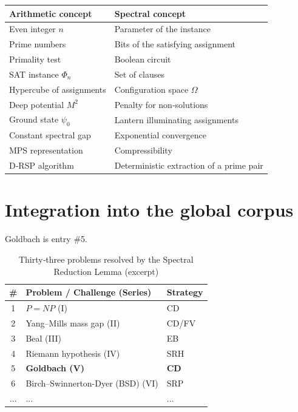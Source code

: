 \documentclass[11pt,a4paper]{article}
\begin{document}
\begin{center}
\small
\begin{tabular}{@{}l|l@{}}
\toprule
\textbf{Arithmetic concept} & \textbf{Spectral concept} \\
\midrule
Even integer $n$ & Parameter of the instance \\
Prime numbers & Bits of the satisfying assignment \\
Primality test & Boolean circuit \\
SAT instance $\Phi_n$ & Set of clauses \\
Hypercube of assignments & Configuration space $\Omega$ \\
Deep potential $M^2$ & Penalty for non‑solutions \\
Ground state $\psi_0$ & Lantern illuminating assignments \\
Constant spectral gap & Exponential convergence \\
MPS representation & Compressibility \\
D‑RSP algorithm & Deterministic extraction of a prime pair \\
\bottomrule
\end{tabular}
\end{center}

\section{Integration into the global corpus}

Goldbach is entry \#5.

\begin{center}
\small
\begin{longtable}{@{}cll@{}}
\caption{Thirty‑three problems resolved by the Spectral Reduction Lemma (excerpt)}\\
\toprule
\# & Problem / Challenge (Series) & Strategy \\
\midrule
1 & \(P = NP\) (I) & CD \\
2 & Yang–Mills mass gap (II) & CD/FV \\
3 & Beal (III) & EB \\
4 & Riemann hypothesis (IV) & SRH \\
5 & \textbf{Goldbach (V)} & \textbf{CD} \\
6 & Birch–Swinnerton-Dyer (BSD) (VI) & SRP \\
... & ... & ... \\
\bottomrule
\end{longtable}
\end{center}
\end{document}
